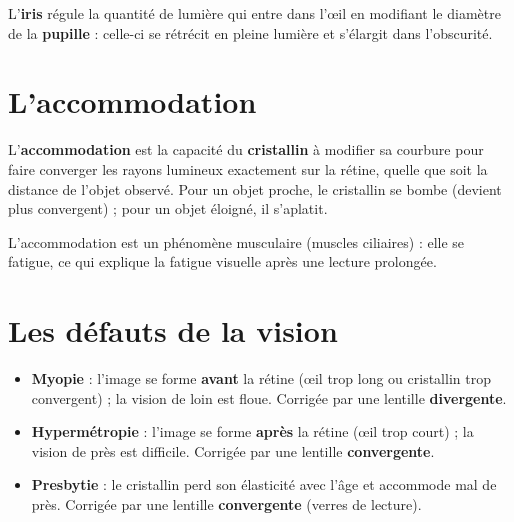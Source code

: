 \begin{propriete}
L'\textbf{iris} régule la quantité de lumière qui entre dans l'œil en modifiant le
diamètre de la \textbf{pupille} : celle-ci se rétrécit en pleine lumière et s'élargit
dans l'obscurité.
\end{propriete}

\section{L'accommodation}

\begin{definition}[Accommodation]
L'\textbf{accommodation} est la capacité du \textbf{cristallin} à modifier sa courbure
pour faire converger les rayons lumineux exactement sur la rétine, quelle que soit la
distance de l'objet observé. Pour un objet proche, le cristallin se bombe (devient plus
convergent) ; pour un objet éloigné, il s'aplatit.
\end{definition}

\begin{remarque}
L'accommodation est un phénomène musculaire (muscles ciliaires) : elle se fatigue, ce qui
explique la fatigue visuelle après une lecture prolongée.
\end{remarque}

\section{Les défauts de la vision}

\begin{propriete}
\begin{itemize}
\item \textbf{Myopie} : l'image se forme \textbf{avant} la rétine (œil trop long ou
cristallin trop convergent) ; la vision de loin est floue. Corrigée par une lentille
\textbf{divergente}.
\item \textbf{Hypermétropie} : l'image se forme \textbf{après} la rétine (œil trop court) ;
la vision de près est difficile. Corrigée par une lentille \textbf{convergente}.
\item \textbf{Presbytie} : le cristallin perd son élasticité avec l'âge et accommode mal
de près. Corrigée par une lentille \textbf{convergente} (verres de lecture).
\end{itemize}
\end{propriete}

